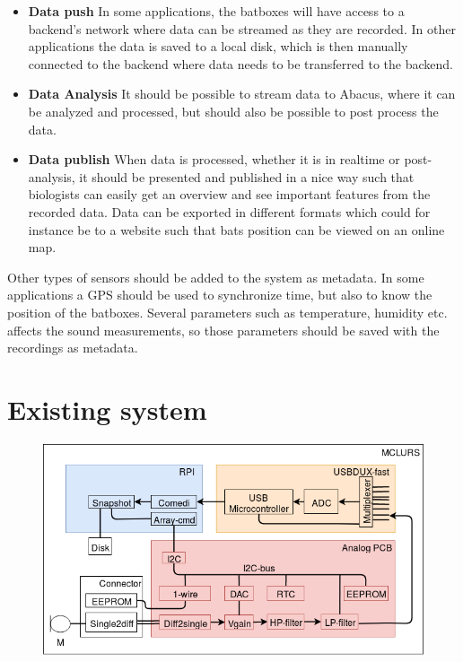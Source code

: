 \begin{itemize}
	\item \textbf{Data push} In some applications, the batboxes will have access to a backend’s network where data can be streamed as they are recorded. In other applications the data is saved to a local disk, which is then manually connected to the backend where data needs to be transferred to the backend.
	
	\item \textbf{Data Analysis} It should be possible to stream data to Abacus, where it can be analyzed and processed, but should also be possible to post process the data.

	\item \textbf{Data publish} When data is processed, whether it is in realtime or post-analysis, it should be presented and published in a nice way such that biologists can easily get an overview and see important features from the recorded data. Data can be exported in different formats which could for instance be to a website such that bats position can be viewed on an online map.

\end{itemize}


Other types of sensors should be added to the system as metadata. In some applications a GPS should be used to synchronize time, but also to know the position of the batboxes. Several parameters such as temperature, humidity etc. affects the sound measurements, so those parameters should be saved with the recordings as metadata. 

\section{Existing system}

\begin{figure}[h!]
	\includegraphics[width=1\textwidth]{figures/existing-system-overview.png} 
\end{figure}

